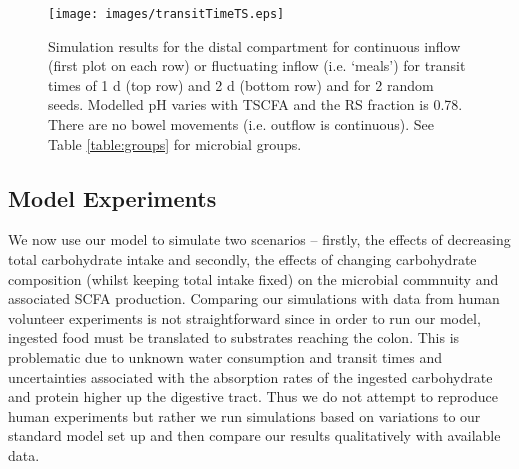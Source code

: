 \documentclass[a4paper]{article}
\begin{document}
 \begin{figure}
    \centering
   \texttt{[image: images/transitTimeTS.eps]}
    \caption{Simulation results for the distal compartment for continuous inflow (first plot on each row) or fluctuating inflow (i.e. `meals') for transit times of 1 d (top row) and 2 d (bottom row) and for 2 random seeds. Modelled pH varies with TSCFA and the RS fraction is 0.78. There are no bowel movements (i.e. outflow is continuous). See Table \ref{table:groups} for microbial groups.
    }
    \label{fig:flucInflowTt}
\end{figure}



\subsection*{Model Experiments}
We now use our model to simulate two scenarios -- firstly, the effects of decreasing total carbohydrate intake and secondly, the effects of changing carbohydrate composition (whilst keeping total intake fixed) on the microbial commnuity and associated SCFA production.
Comparing our simulations with data from human volunteer experiments is not straightforward since in order to run our model, ingested food must be translated to substrates reaching the colon. This is problematic due to unknown water consumption and transit times and uncertainties associated with the absorption rates of the ingested carbohydrate and protein higher up the digestive tract.
Thus we do not attempt to reproduce human experiments but rather we run simulations based on variations to our standard model set up and then compare our results qualitatively with available data.



\end{document}
